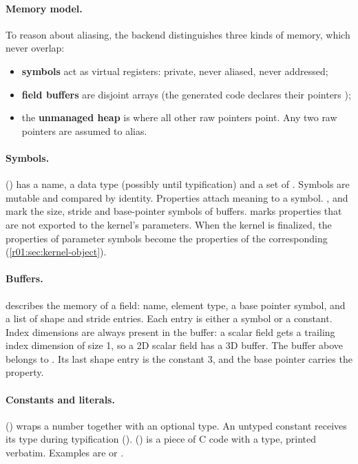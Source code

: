 \paragraph{Memory model.}
To reason about aliasing, the backend distinguishes three kinds of memory, which never
overlap:
\begin{itemize}
  \item \textbf{symbols} act as virtual registers: private, never aliased, never
        addressed;
  \item \textbf{field buffers} are disjoint arrays (the generated code declares their
        pointers );
  \item the \textbf{unmanaged heap} is where all other raw pointers point. Any two raw
        pointers are assumed to alias.
\end{itemize}

\paragraph{Symbols.}
 () has a name, a data type (possibly 
until typification) and a set of . Symbols are mutable and compared by
identity. Properties attach meaning to a symbol. , 
and  mark the size, stride and base-pointer symbols of buffers.
 marks properties that are not exported to the kernel's
parameters. When the kernel is finalized, the properties of parameter symbols become the
properties of the corresponding  (\cref{r01:sec:kernel-object}).

\paragraph{Buffers.}
 describes the memory of a field: name, element type, a base pointer
symbol, and a list of shape and stride entries. Each entry is either a symbol or a
constant. Index dimensions are always present in the buffer: a scalar field gets a
trailing index dimension of size 1, so a 2D scalar field has a 3D buffer. The buffer
above belongs to . Its last shape entry is the constant 3, and
the base pointer  carries the  property.

\paragraph{Constants and literals.}
 () wraps a number together with an optional
type. An untyped constant receives its type during typification
().  () is a piece of
C code with a type, printed verbatim. Examples are  or
.

